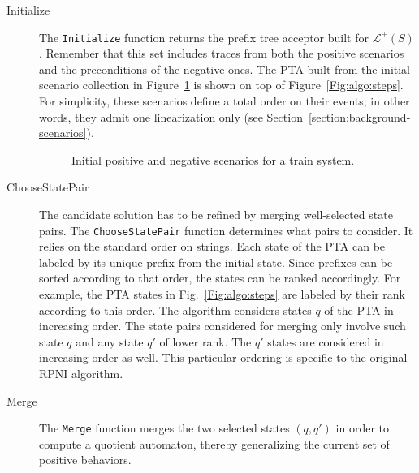 \begin{description}

\item[Initialize] The \texttt{Initialize} function returns the prefix tree acceptor built for $\mathcal{L}^+(S)$. Remember that this set includes traces from both the positive scenarios and the preconditions of the negative ones. The PTA built from the initial scenario collection in Figure~\ref{Fig:init:scen} is shown on top of Figure~\ref{Fig:algo:steps}. For simplicity, these scenarios define a total order on their events; in other words, they admit one linearization only (see Section~\ref{section:background-scenarios}). 

\begin{figure}
\centering
{}
\caption{Initial positive and negative scenarios for a train system\label{Fig:init:scen}.}
\end{figure}

\item[ChooseStatePair] The candidate solution has to be refined by merging well-selected state pairs. The \texttt{ChooseStatePair} function determines what pairs to consider. It relies on the standard order on strings. Each state of the PTA can be labeled by its unique prefix from the initial state. Since prefixes can be sorted according to that order, the states can be ranked accordingly. For example, the PTA states in Fig.~\ref{Fig:algo:steps} are labeled by their rank according to this order. The algorithm considers states $q$ of the PTA in increasing order. The state pairs considered for merging only involve such state $q$ and any state $q'$ of lower rank. The $q'$ states are considered in increasing order as well. This particular ordering is specific to the original RPNI algorithm.

\item[Merge] The \texttt{Merge} function merges the two selected states $(q, q')$ in order to compute a quotient automaton, thereby generalizing the current set of positive behaviors. 


\end{description}
